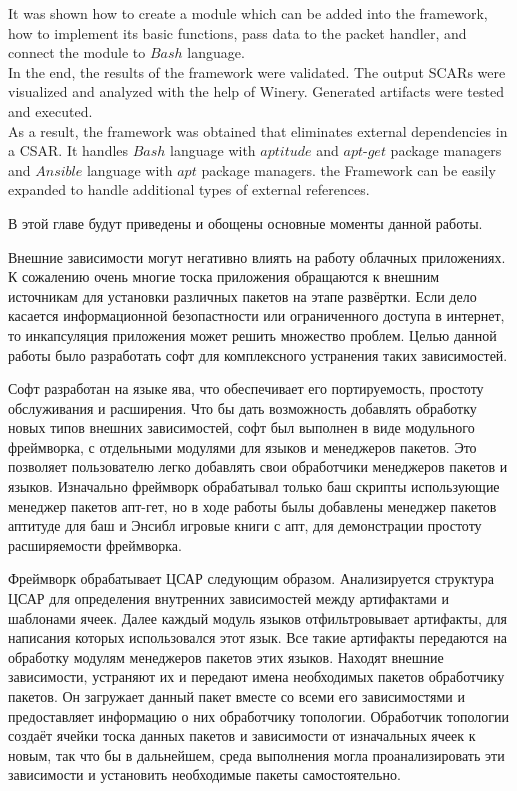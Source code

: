 It  was shown how to create a module which can be added into the framework, how to implement its basic functions, pass data to the packet handler, and connect the module to $Bash$ language. \\
In the end, the results of the framework were validated.
The output SCARs were visualized and analyzed with the help of Winery.
Generated artifacts were tested and executed.\\
As a result, the framework was obtained that eliminates external dependencies in a CSAR.
It handles $Bash$ language with $aptitude$ and $apt$-$get$ package managers and $Ansible$ language with $apt$ package managers.
the Framework can be easily expanded to handle additional types of external references. 

В этой главе будут приведены и обощены основные моменты данной работы.

Внешние зависимости могут негативно влиять на работу облачных приложениях.
К сожалению очень многие тоска приложения обращаются к внешним источникам для установки различных пакетов на этапе развёртки.
Если дело касается информационной безопастности или ограниченного доступа в интернет, то инкапсуляция приложения может решить множество проблем.
Целью данной работы было разработать софт для комплексного устранения таких зависимостей.

Софт разработан на языке ява, что обеспечивает его портируемость, простоту обслуживания и расширения.
Что бы дать возможность добавлять обработку новых типов внешних зависимостей, софт был выполнен в виде модульного фреймворка, с отдельными модулями для языков и менеджеров пакетов.
Это позволяет пользователю легко добавлять свои обработчики менеджеров пакетов и языков.
Изначально фреймворк обрабатывал только баш скрипты использующие менеджер пакетов апт-гет, но в ходе работы былы добавлены менеджер пакетов аптитуде для баш и Энсибл игровые книги с апт, для демонстрации простоту расширяемости фреймворка. 

Фреймворк обрабатывает ЦСАР следующим образом. 
Анализируется структура ЦСАР для определения внутренних зависимостей между артифактами и шаблонами ячеек.
Далее каждый модуль языков отфильтровывает артифакты, для написания которых использовался этот язык.
Все такие артифакты передаются на обработку модулям менеджеров пакетов этих языков. 
Находят внешние зависимости, устраняют их и передают имена необходимых пакетов обработчику пакетов.
Он загружает данный пакет вместе со всеми его зависимостями и предоставляет информацию о них обработчику топологии.
Обработчик топологии создаёт ячейки тоска данных пакетов и зависимости от изначальных ячеек к новым, так что бы в дальнейшем, среда выполнения могла проанализировать эти зависимости и установить необходимые пакеты самостоятельно.

